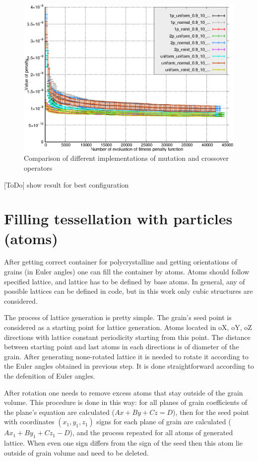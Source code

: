 \documentclass[12pt]{report}
\begin{document}
\begin{figure}
    \centering
    \includegraphics[width=5.0in]{operators_comparison_err_orient}
    \caption{Comparison of different implementations of mutation and crossover operators}
    \label{operatorcomparisonorienterr}
\end{figure}

[ToDo] show result for best configuration


\section{Filling tessellation with particles (atoms)}

After getting correct container for polycrystalline and getting orientations of grains (in Euler angles) one can fill the container by atoms. Atoms should follow specified lattice, and lattice has to be defined by base atoms. In general, any of possible lattices can be defined in code, but in this work only cubic structures are considered.

The process of lattice generation is pretty simple. The grain's seed point is considered as a starting point for lattice generation. Atoms located in oX, oY, oZ directions with lattice constant periodicity starting from this point. The distance between starting point and last atoms in each directions is of diameter of the grain. After generating none-rotated lattice it is needed to rotate it according to the Euler angles obtained in previous step. It is done straightforward according to the defenition of Euler angles. 

After rotation one needs to remove excess atoms that stay outside of the grain volume. This procedure is done in this way: for all planes of grain coefficients of the plane's equation are calculated ($Ax + By + Cz = D$), then for the seed point with coordinates $(x_1, y_1, z_1)$ signs for each plane of grain are calculated ($Ax_1 + By_1 + Cz_1 - D$), and the process repeated for all atoms of generated lattice. When even one sign differs from the sign of the seed then this atom lie outside of grain volume and need to be deleted.
\end{document}
